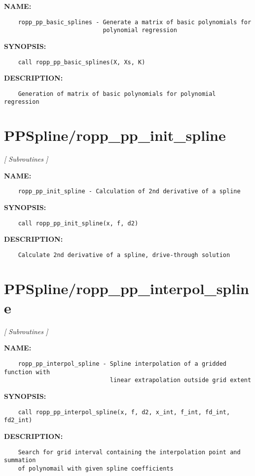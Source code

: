 \label{ch:robo55}
\label{ch:PPSpline_ropp_pp_basic_splines}
\textbf{NAME:}\hspace{0.08in}\begin{Verbatim}
    ropp_pp_basic_splines - Generate a matrix of basic polynomials for
                            polynomial regression
\end{Verbatim}
\textbf{SYNOPSIS:}\hspace{0.08in}\begin{Verbatim}
    call ropp_pp_basic_splines(X, Xs, K)
\end{Verbatim}
\textbf{DESCRIPTION:}\hspace{0.08in}\begin{Verbatim}
    Generation of matrix of basic polynomials for polynomial regression
\end{Verbatim}
\section{PPSpline/ropp\_pp\_init\_spline}
\textsl{[ Subroutines ]}

\label{ch:robo56}
\label{ch:PPSpline_ropp_pp_init_spline}
\textbf{NAME:}\hspace{0.08in}\begin{Verbatim}
    ropp_pp_init_spline - Calculation of 2nd derivative of a spline
\end{Verbatim}
\textbf{SYNOPSIS:}\hspace{0.08in}\begin{Verbatim}
    call ropp_pp_init_spline(x, f, d2)
\end{Verbatim}
\textbf{DESCRIPTION:}\hspace{0.08in}\begin{Verbatim}
    Calculate 2nd derivative of a spline, drive-through solution
\end{Verbatim}
\section{PPSpline/ropp\_pp\_interpol\_spline}
\textsl{[ Subroutines ]}

\label{ch:robo57}
\label{ch:PPSpline_ropp_pp_interpol_spline}
\textbf{NAME:}\hspace{0.08in}\begin{Verbatim}
    ropp_pp_interpol_spline - Spline interpolation of a gridded function with
                              linear extrapolation outside grid extent
\end{Verbatim}
\textbf{SYNOPSIS:}\hspace{0.08in}\begin{Verbatim}
    call ropp_pp_interpol_spline(x, f, d2, x_int, f_int, fd_int, fd2_int)
\end{Verbatim}
\textbf{DESCRIPTION:}\hspace{0.08in}\begin{Verbatim}
    Search for grid interval containing the interpolation point and summation
    of polynomail with given spline coefficients
\end{Verbatim}
